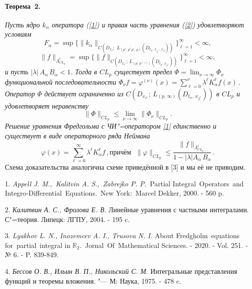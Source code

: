 \paragraph{Теорема~2.}
{\it Пусть
ядро $k_\alpha$ оператора (\ref{1}) и правая часть уравнения (\ref{2}) удовлетворяют условиям
$$F_\alpha=\sup \biggl\{\|k_{\alpha}\|_{C(D_{x_\tau};\,\, L_{(p',\,p^\ell\, p',\, p)}(D_{t_\alpha,\, x_{\beta^*}\,, x_\beta}))}\biggl\}_{\ell=1}^\infty<\infty,$$
 $$\|f\|_{\Lambda_{CL_p}^{\ell}}=\sup \biggl\{\|f\|_{C(D_{x_{\tau^*}};\,L_{(p,\,p^{\ell+1})}(D_{t_\alpha,\,x_{\beta^*}}))}\biggl\}_{\ell=1}^\infty<\infty,$$
и пусть    $|\lambda|\,A_\alpha\,B_\alpha<1$. Тогда в  $CL_p$ существует предел  $\Phi=\lim_{\nu\to\infty}\Phi_\nu$
функциональной последовательности
$
\Phi_\nu f= \varphi^{(\nu)}(x)=\sum\limits_{\ell=0}^\nu \lambda^\ell K_\alpha^\ell f(x)\,.
$
Оператор $\Phi$ действует ограниченно из $C(D_{x_{\tau^*}};\,L_{(p,\,\infty)}(D_{t_\alpha,\,x_{\beta^*}}))$ в
 $CL_p$  и удовлетворяет неравенству
$$
\|\Phi\|_{CL_p}\leq{\lim_{\overline{\nu\to\infty}}}\|\Phi_\nu\|_{CL_p}.
$$
 Решение уравнения Фредгольма  с ЧИ"=оператором
\eqref{1} единственно и существует в виде операторного ряда Неймана
$$
\varphi(x)=\sum\limits_{\ell=0}^\infty \lambda^\ell K_\alpha^\ell f\,,
\text{причём}\,\,\,\,\|\varphi\|_{CL_{p}}\leq\frac{\|f\|_{\Lambda_{CL_p}^\ell}}{1-|\lambda| A_\alpha\,B_\alpha}\,.
$$}
Схема доказательства аналогична схеме приведённой в [3] и мы её не приводим.

\litlist


1. {\it Appell J. M.,\, Kalitvin A. S.,\, Zabrejko P. P.}\, Partial Integral\, Operators\, and\, Integro-Differential\, Equations.\, New York:\, Marcel Dekker, 2000. - 560 p.


2. {\it Калитвин А. С., Фролова Е. В.}
Линейные уравнения с частными интегралами. С"=теория. Липецк: ЛГПУ, 2004. - 195 c.


3. {\it Lyakhov L. N., Inozemcev A. I., Trusova N. I.} About Fredgholm\, equations\, for\, partial\, integral in $\mathbb{R}_2$.\, Jornal\, Of\, Mathematical Sciences. - 2020. - Vol. 251. - № 6. - P. 839-849.


4. {\it Бессов О. В., Ильин В. П., Никольский С. М.} Интегральные представления функций и теоремы вложения. "--- М: Наука, 1975. - 478 c.
